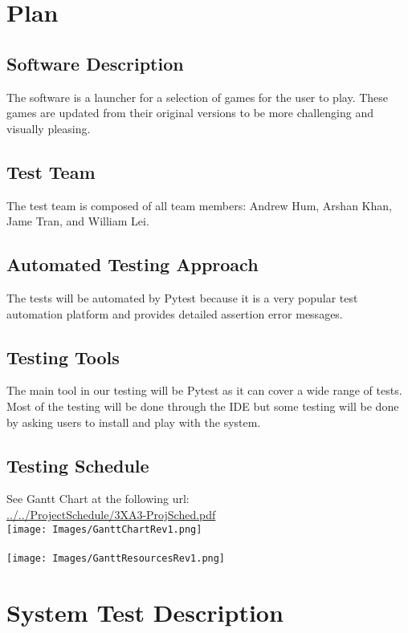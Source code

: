 \documentclass[12pt, titlepage]{article}
\begin{document}
\section{Plan}
	
\subsection{Software Description}

The software is a launcher for a selection of games for the user to play. These games are updated from their original versions to be more challenging and visually pleasing.

\subsection{Test Team}

The test team is composed of all team members: Andrew Hum, Arshan Khan, Jame Tran, and William Lei.

\subsection{Automated Testing Approach}

The tests will be automated by Pytest because it is a very popular test automation platform and provides detailed assertion error messages.

\subsection{Testing Tools}
The main tool in our testing will be Pytest as it can cover a wide range of tests. Most of the testing will be done through the IDE but some testing will be done by asking users to install and play with the system.

\subsection{Testing Schedule}
		
See Gantt Chart at the following url: \\
\url{../../ProjectSchedule/3XA3-ProjSched.pdf}\\
\texttt{[image: Images/GanttChartRev1.png]}\\
\\
\texttt{[image: Images/GanttResourcesRev1.png]}

\section{System Test Description}
	
\end{document}
